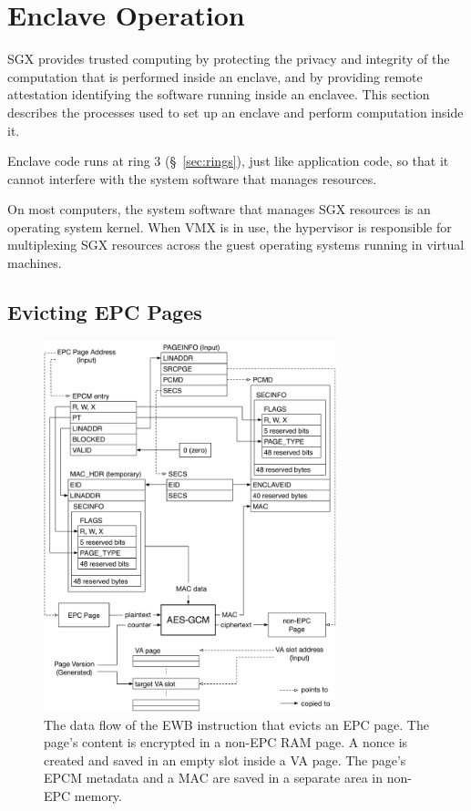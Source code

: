 \section{Enclave Operation}

SGX provides trusted computing by protecting the privacy and integrity of the
computation that is performed inside an enclave, and by providing remote
attestation identifying the software running inside an enclavee. This section
describes the processes used to set up an enclave and perform computation
inside it.


Enclave code runs at ring 3 (\S~\ref{sec:rings}), just like application code,
so that it cannot interfere with the system software that manages resources.


On most computers, the system software that manages SGX resources is an
operating system kernel. When VMX is in use, the hypervisor is responsible for
multiplexing SGX resources across the guest operating systems running in
virtual machines.


\subsection{Evicting EPC Pages}
\label{sec:sgx_ewb}



\begin{figure}[hbt!]
  \centering
  \includegraphics[width=85mm]{figures/sgx_ewb.pdf}
  \caption{
    The data flow of the EWB instruction that evicts an EPC page. The page's
    content is encrypted in a non-EPC RAM page. A nonce is created and saved
    in an empty slot inside a VA page. The page's EPCM metadata and a MAC
    are saved in a separate area in non-EPC memory.
  }
  \label{fig:sgx_ewb}
\end{figure}



